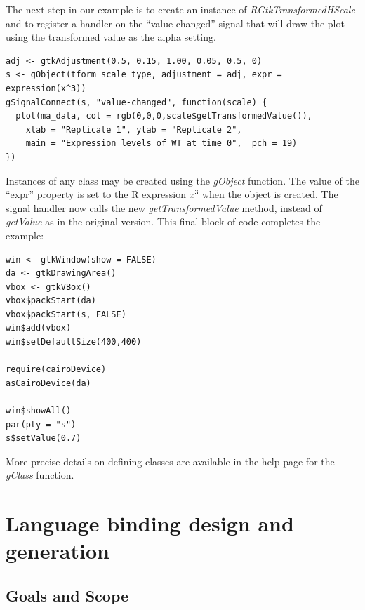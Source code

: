 \documentclass[article]{jss}
\begin{document}
The next step in our example is to create an instance
of \emph{RGtkTransformedHScale} and to register a handler on the 
``value-changed'' signal that will draw the plot using the transformed
value as 
the alpha setting.
\begin{verbatim}
adj <- gtkAdjustment(0.5, 0.15, 1.00, 0.05, 0.5, 0)
s <- gObject(tform_scale_type, adjustment = adj, expr =
expression(x^3))
gSignalConnect(s, "value-changed", function(scale) {
  plot(ma_data, col = rgb(0,0,0,scale$getTransformedValue()),
    xlab = "Replicate 1", ylab = "Replicate 2", 
    main = "Expression levels of WT at time 0",  pch = 19)
})
\end{verbatim}
Instances of any  class may be created using the
\emph{gObject} function.  The value of the ``expr'' property is set to
the R expression $x^3$ when the object is created.  The signal handler
now calls the new \emph{getTransformedValue} method, instead of
\emph{getValue} as in the original version. This final block of code
completes the example:
\begin{verbatim}
win <- gtkWindow(show = FALSE)
da <- gtkDrawingArea()
vbox <- gtkVBox()
vbox$packStart(da)
vbox$packStart(s, FALSE)
win$add(vbox)
win$setDefaultSize(400,400)

require(cairoDevice)
asCairoDevice(da)

win$showAll()
par(pty = "s")
s$setValue(0.7)
\end{verbatim}

More precise details on defining  classes are available
in the 
 help page for the \emph{gClass} function.


\section{Language binding design and generation}

\subsection{Goals and Scope}
\end{document}
